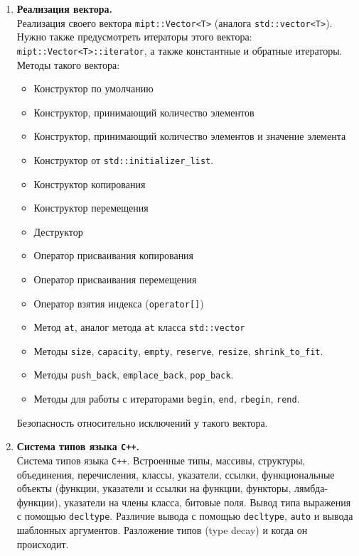 \documentclass{article}
\begin{document}
\begin{enumerate}
\item \textbf{Реализация вектора.}\\
Реализация своего вектора \texttt{mipt::Vector<T>} (аналога \texttt{std::vector<T>}). Нужно также предусмотреть итераторы этого вектора: \texttt{mipt::Vector<T>::iterator}, а также константные и обратные итераторы.\\
Методы такого вектора:
\begin{itemize}
\item Конструктор по умолчанию
\item Конструктор, принимающий количество элементов
\item Конструктор, принимающий количество элементов и значение элемента
\item Конструктор от \texttt{std::initializer\_list}.
\item Конструктор копирования
\item Конструктор перемещения
\item Деструктор
\item Оператор присваивания копирования
\item Оператор присваивания перемещения
\item Оператор взятия индекса (\texttt{operator[]})
\item Метод \texttt{at}, аналог метода \texttt{at} класса \texttt{std::vector}

\item Методы \texttt{size}, \texttt{capacity}, \texttt{empty}, \texttt{reserve}, \texttt{resize}, \texttt{shrink\_to\_fit}.
\item Методы \texttt{push\_back}, \texttt{emplace\_back}, \texttt{pop\_back}.

\item Методы для работы с итераторами \texttt{begin}, \texttt{end}, \texttt{rbegin}, \texttt{rend}.
\end{itemize}

Безопасность относительно исключений у такого вектора.




\item \textbf{Система типов языка \texttt{C++}.}\\
Система типов языка \texttt{C++}. Встроенные типы, массивы, структуры, объединения, перечисления, классы, указатели, ссылки, функциональные объекты (функции, указатели и ссылки на функции, функторы, лямбда-функции), указатели на члены класса, битовые поля. Вывод типа выражения с помощью \texttt{decltype}. Различие вывода с помощью \texttt{decltype}, \texttt{auto} и вывода шаблонных аргументов. Разложение типов (type decay) и когда он происходит.



\end{enumerate}
\end{document}

